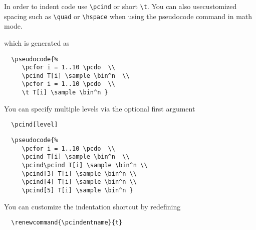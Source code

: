 \documentclass[a4paper]{report}
\begin{document}
  In order to indent code use \lstinline$\pcind$ or short \lstinline$\t$. You can also usecustomized spacing such as \lstinline$\quad$ or \lstinline$\hspace$
  when using the pseudocode command in math mode.
  \begin{center}
  \end{center}
  which is generated as
  \begin{lstlisting}
  \pseudocode{%
	 \pcfor i = 1..10 \pcdo  \\
	 \pcind T[i] \sample \bin^n  \\
	 \pcfor i = 1..10 \pcdo  \\
	 \t T[i] \sample \bin^n }
  \end{lstlisting}
  You can specify multiple levels via the optional first argument
  \begin{lstlisting}
  \pcind[level]
  \end{lstlisting}
  \begin{center}
  \end{center}
  \begin{lstlisting}
  \pseudocode{%
	 \pcfor i = 1..10 \pcdo  \\
	 \pcind T[i] \sample \bin^n  \\
	 \pcind\pcind T[i] \sample \bin^n \\
	 \pcind[3] T[i] \sample \bin^n \\
	 \pcind[4] T[i] \sample \bin^n \\
	 \pcind[5] T[i] \sample \bin^n }
  \end{lstlisting}
  
  You can customize the indentation shortcut by redefining
  \begin{lstlisting}
  \renewcommand{\pcindentname}{t}
  \end{lstlisting}
  
\end{document}
